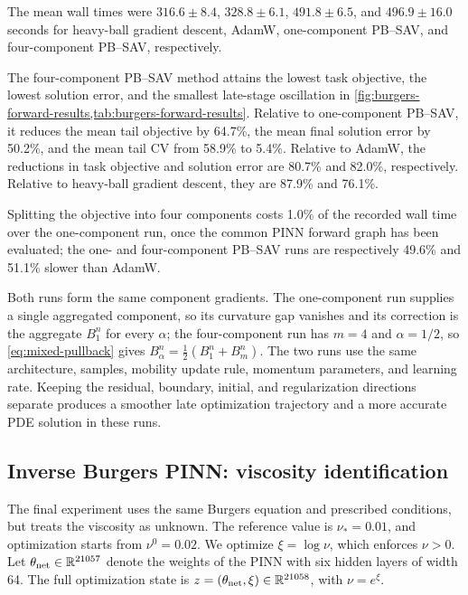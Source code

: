 The mean wall times were \(316.6\pm8.4\), \(328.8\pm6.1\),
\(491.8\pm6.5\), and \(496.9\pm16.0\) seconds for heavy-ball gradient
descent, AdamW, one-component PB--SAV, and four-component PB--SAV,
respectively.

The four-component PB--SAV method attains the lowest task objective, the
lowest solution error, and the smallest late-stage oscillation in
\cref{fig:burgers-forward-results,tab:burgers-forward-results}.  Relative to
one-component PB--SAV, it reduces the mean tail objective by 64.7\%, the mean
final solution error by 50.2\%, and the mean tail CV from 58.9\% to 5.4\%.
Relative to AdamW, the reductions in task objective and solution error are
80.7\% and 82.0\%, respectively.  Relative to heavy-ball gradient descent,
they are 87.9\%
and 76.1\%.

Splitting the objective into four components costs 1.0\% of the recorded
wall time over the one-component run, once the common PINN forward graph has
been evaluated; the one- and four-component PB--SAV runs are respectively
49.6\% and 51.1\% slower than AdamW.

Both runs form the same component gradients.  The one-component run supplies a
single aggregated component, so its curvature gap vanishes and its correction
is the aggregate \(B_1^n\) for every \(\alpha\); the four-component run has
\(m=4\) and \(\alpha=1/2\), so \cref{eq:mixed-pullback} gives
\(B_\alpha^n=\tfrac12(B_1^n+B_m^n)\).  The two runs use the same architecture,
samples, mobility update rule, momentum parameters, and learning rate.
Keeping the residual, boundary, initial, and regularization directions
separate produces a smoother late optimization trajectory and a more accurate
PDE solution in these runs.

\subsection{Inverse Burgers PINN: viscosity identification}
\label{sec:burgers-inverse-experiment}

The final experiment uses the same Burgers equation and prescribed conditions,
but treats the viscosity as unknown.  The reference value is
\(\nu_*=0.01\), and optimization starts from \(\nu^0=0.02\).  We optimize
\(\xi=\log\nu\), which enforces \(\nu>0\).  Let \(\theta_{\rm net}\in\mathbb{R}^{21057}\) denote the
weights of the PINN with six hidden layers of width 64.  The full optimization
state is \(z=(\theta_{\rm net},\xi)\in\mathbb{R}^{21058}\), with \(\nu=e^\xi\).

